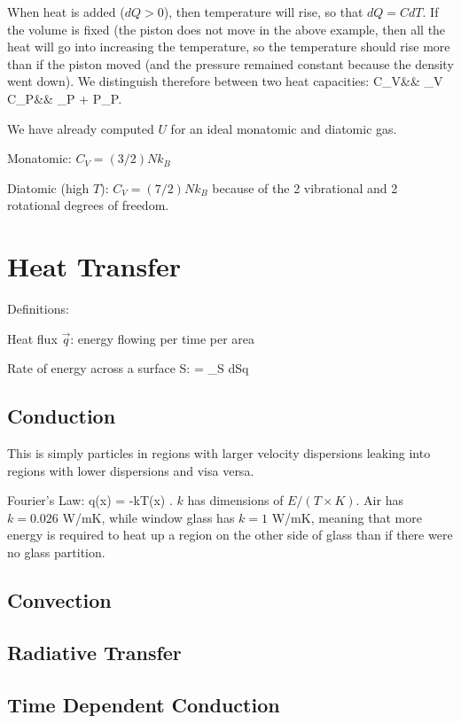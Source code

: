 \documentclass[11pt]{book}
\begin{document}
When heat is added ($dQ>0$), then temperature will rise, so that $dQ=CdT$. If the volume is fixed (the piston does not move in the above example, then all the heat will go into increasing the temperature, so the temperature should rise more than if the piston moved (and the pressure remained constant because the density went down). We distinguish therefore between two heat capacities:
\bea
C_V&\equiv& \Big\vert_V
\vs
C_P&\equiv& \Big\vert_P + P\Big\vert_P.
\eea

We have already computed $U$ for an ideal monatomic and diatomic gas. 
\bei
\item Monatomic: $C_V = (3/2) Nk_B$
\item Diatomic (high $T$): $C_V=(7/2) N k_B$ because of the 2 vibrational and 2 rotational degrees of freedom.
\eei

\chapter{Heat Transfer}

Definitions:
\bei
\item Heat flux $\vec q$: energy flowing per time per area
\item Rate of energy across a surface S: \be{} = \int_S d\vec S\cdot \vec q\ee
\eei

\section{Conduction}
This is simply particles in regions with larger velocity dispersions leaking into regions with lower dispersions and visa versa.

Fourier's Law: \be \vec q(\vec x) = -k\nabla T(\vec x)
.\ee
$k$ has dimensions of $E/(T\times K)$. Air has $k=0.026$ W/mK, while window glass has $k=1$ W/mK, meaning that more energy is required to heat up a region on the other side of glass than if there were no glass partition.

\section{Convection}
\section{Radiative Transfer}
\section{Time Dependent Conduction}
\end{document}
